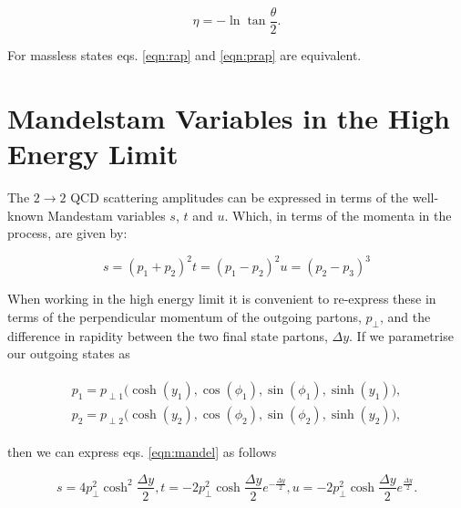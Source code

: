 		\begin{equation}
			\eta = -\ln\tan\frac{\theta}{2}.
			\label{eqn:prap}
		\end{equation}

		For massless states eqs. \eqref{eqn:rap} and \eqref{eqn:prap} are equivalent.

	\section{Mandelstam Variables in the High Energy Limit}
		\label{sub:MandelstamVariables}

		The $2\rightarrow 2$ QCD scattering amplitudes can be expressed in terms of the well-known Mandestam
		variables $s$, $t$ and $u$.  Which, in terms of the momenta in the process, are given by:

		\begin{subequations}
			\begin{equation}
				s = (p_1 + p_2)^2
			\end{equation}
			\begin{equation}
				t = (p_1 - p_2)^2
			\end{equation}
			\begin{equation}
				u = (p_2 - p_3)^3
			\end{equation}
			\label{eqn:mandel}
		\end{subequations}

		When working in the high energy limit it is convenient to re-express these in terms of the
		perpendicular momentum of the outgoing partons, $p_\perp$, and the difference in rapidity
		between the two final state partons, $\Delta y$.  If we parametrise our outgoing states as

		\begin{align}
		\begin{split}
			p_1 = p_{\perp1}\big(\cosh (y_1), \cos(\phi_1), \sin(\phi_1), \sinh (y_1)\big),\\
			p_2 = p_{\perp2}\big(\cosh (y_2), \cos(\phi_2), \sin(\phi_2), \sinh (y_2)\big),
		\end{split}
		\end{align}

		then we can express eqs. \eqref{eqn:mandel} as follows

		\begin{subequations}
			\begin{equation}
				s = 4p_\perp^2 \cosh^2\frac{\Delta y}{2},
			\end{equation}
			\begin{equation}
				t = -2p_\perp^2 \cosh\frac{\Delta y}{2}e^{-\frac{\Delta y}{2}},
			\end{equation}
			\begin{equation}
				u = -2p_\perp^2 \cosh\frac{\Delta y}{2}e^{\frac{\Delta y}{2}}.
			\end{equation}
		\end{subequations}

